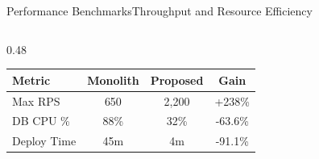 \begin{frame}{Performance Benchmarks}{Throughput and Resource Efficiency}
\begin{columns}[T]
\begin{column}{0.48\textwidth}
      \vspace{0.2cm}
      {\scriptsize
      \begin{tabular}{lccc}
        \toprule
        \textbf{Metric} & \textbf{Monolith} & \textbf{Proposed} & \textbf{Gain} \\
        \midrule
        Max RPS & 650 & 2,200 & +238\% \\
        DB CPU \% & 88\% & 32\% & -63.6\% \\
        Deploy Time & 45m & 4m & -91.1\% \\
        \bottomrule
      \end{tabular}
      }
    \end{column}
  \end{columns}
\end{frame}
